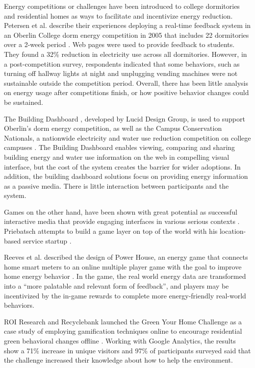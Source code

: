 \documentclass{acm_proc_article-sp}
\begin{document}
Energy competitions or challenges have been introduced to college dormitories
and residential homes as ways to facilitate and incentivize energy reduction.
Petersen et al. describe their experiences deploying a real-time feedback
system in an Oberlin College dorm energy competition in 2005 that includes 22
dormitories over a 2-week period \cite{petersen-dorm-energy-reduction}. Web
pages were used to provide feedback to students. They found a 32\% reduction in
electricity use across all dormitories. However, in a post-competition survey,
respondents indicated that some behaviors, such as turning off hallway lights
at night and unplugging vending machines were not sustainable outside the
competition period.  Overall, there has been little analysis on energy usage
after competitions finish, or how positive behavior changes could be sustained.

The Building Dashboard \cite{building-dashboard}, developed by Lucid Design 
Group, is used to support Oberlin's dorm energy competition,
as well as the Campus Conservation Nationals, a nationwide electricity and 
water use reduction competition on college campuses \cite{competetoreduce}. 
The Building Dashboard enables viewing, comparing and sharing building energy
and water use information on the web in compelling visual interface, but the 
cost of the system creates the barrier for wider adoptions. In addition, the 
building dashboard solutions focus on providing energy information as 
a passive media. There is little interaction between participants and the system.

Games on the other hand, have been shown with great potential as successful
interactive media that provide engaging interfaces in various serious contexts
\cite{mcgonigal2011reality,reeves2009total}. Priebatsch attempts to build a
game layer on top of the world with his location-based service startup
\cite{Priebatsch2010ted}.

Reeves et al. described the design of Power House, an energy game that connects
home smart meters to an online multiple player game with the goal to improve
home energy behavior \cite{Reeves2011powerhouse}. In the game, the real world
energy data are transformed into a ``more palatable and relevant form of
feedback'', and players may be incentivized by the in-game rewards to complete
more energy-friendly real-world behaviors.

ROI Research and Recyclebank launched the Green Your Home Challenge as a case 
study of employing gamification techniques online to 
encourage residential green behavioral changes offline \cite{gamingforgood}. 
Working with Google Analytics, the results show a 71\% increase in unique 
visitors and 97\% of participants surveyed said that the challenge increased 
their knowledge about how to help the environment. 
\end{document}
